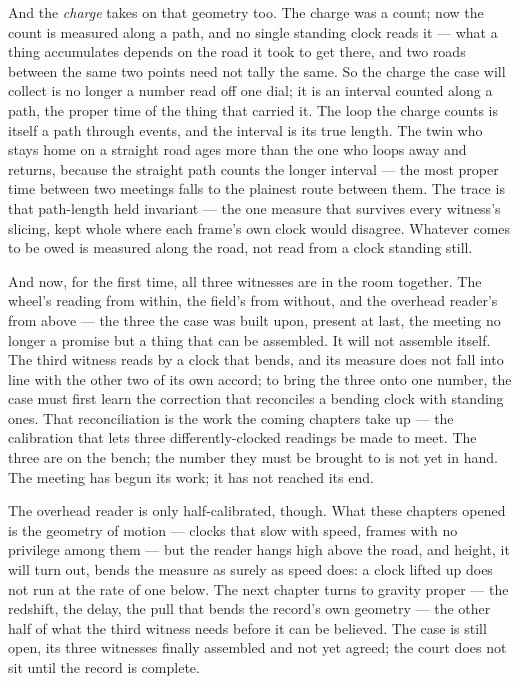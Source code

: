 And the \emph{charge} takes on that geometry too. The charge was a count; now the count is measured along a path,
and no single standing clock reads it --- what a thing accumulates depends on the road it took to get there, and
two roads between the same two points need not tally the same. So the charge the case will collect is no longer
a number read off one dial; it is an interval counted along a path, the proper time of the thing that carried
it. The loop the charge counts is itself a path through events, and the interval is its true length. The twin who
stays home on a straight road ages more than the one who loops away and returns, because the straight path
counts the longer interval --- the most proper time between two meetings falls to the plainest route between
them. The trace
is that path-length held invariant --- the one measure that survives every witness's slicing, kept whole where
each frame's own clock would disagree. Whatever comes to be owed is measured along the road, not read from a
clock standing still.

And now, for the first time, all three witnesses are in the room together. The wheel's reading from within, the
field's from without, and the overhead reader's from above --- the three the case was built upon, present at
last, the meeting no longer a promise but a thing that can be assembled. It will not assemble itself. The third
witness reads by a clock that bends, and its measure does not fall into line with the other two of its own
accord; to bring the three onto one number, the case must first learn the correction that reconciles a bending
clock with standing ones. That reconciliation is the work the coming chapters take up --- the calibration that
lets three differently-clocked readings be made to meet. The three are on the bench; the number they must be
brought to is not yet in hand. The meeting has begun its work; it has not reached its end.

The overhead reader is only half-calibrated, though. What these chapters opened is the geometry of motion ---
clocks that slow with speed, frames with no privilege among them --- but the reader hangs high above the road,
and height, it will turn out, bends the measure as surely as speed does: a clock lifted up does not run at the
rate of one below. The next chapter turns to gravity proper --- the redshift, the delay, the pull that bends the
record's own geometry --- the other half of what the third witness needs before it can be believed. The case is
still open, its three witnesses finally assembled and not yet agreed; the court does not sit until the record is
complete.

